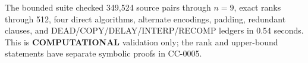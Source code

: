 \documentclass[11pt]{article}
\begin{document}
The bounded suite checked 349,524 source pairs through $n=9$, exact ranks
through 512, four direct algorithms, alternate encodings, padding, redundant
clauses, and DEAD/COPY/DELAY/INTERP/RECOMP ledgers in 0.54 seconds.  This is
\textbf{COMPUTATIONAL} validation only; the rank and upper-bound statements
have separate symbolic proofs in CC-0005.



\end{document}
